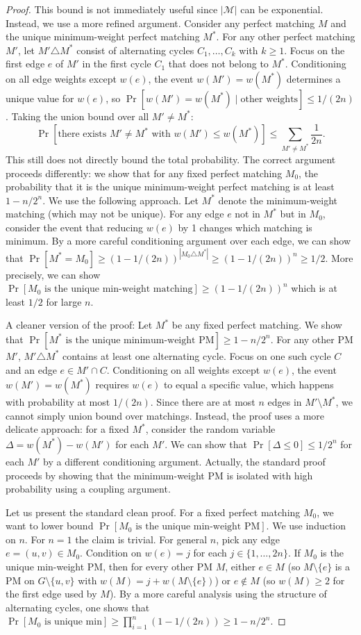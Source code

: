 \documentclass[twoside,12pt]{book}
\theoremstyle{plain}
\theoremstyle{definition}
\theoremstyle{remark}
\begin{document}
\begin{proof}
This bound is not immediately useful since $|\mathcal{M}|$ can be exponential. Instead, we use a more refined argument. Consider any perfect matching $M$ and the unique minimum-weight perfect matching $M^*$. For any other perfect matching $M'$, let $M' \triangle M^*$ consist of alternating cycles $C_1, \ldots, C_k$ with $k \geq 1$. Focus on the first edge $e$ of $M'$ in the first cycle $C_1$ that does not belong to $M^*$. Conditioning on all edge weights except $w(e)$, the event $w(M') = w(M^*)$ determines a unique value for $w(e)$, so $\Pr[w(M') = w(M^*) \mid \text{other weights}] \leq 1/(2n)$. Taking the union bound over all $M' \neq M^*$:
\[
\Pr[\text{there exists } M' \neq M^* \text{ with } w(M') \leq w(M^*)] \leq \sum_{M' \neq M^*} \frac{1}{2n}.
\]
This still does not directly bound the total probability. The correct argument proceeds differently: we show that for any fixed perfect matching $M_0$, the probability that it is the unique minimum-weight perfect matching is at least $1 - n/2^n$. We use the following approach. Let $M^*$ denote the minimum-weight matching (which may not be unique). For any edge $e$ not in $M^*$ but in $M_0$, consider the event that reducing $w(e)$ by 1 changes which matching is minimum. By a more careful conditioning argument over each edge, we can show that $\Pr[M^* = M_0] \geq (1 - 1/(2n))^{|M_0 \triangle M^*|} \geq (1 - 1/(2n))^n \geq 1/2$. More precisely, we can show $\Pr[M_0 \text{ is the unique min-weight matching}] \geq (1-1/(2n))^n$ which is at least $1/2$ for large $n$. 

A cleaner version of the proof: Let $M^*$ be any fixed perfect matching. We show that $\Pr[M^* \text{ is the unique minimum-weight PM}] \geq 1 - n/2^n$. For any other PM $M'$, $M' \triangle M^*$ contains at least one alternating cycle. Focus on one such cycle $C$ and an edge $e \in M' \cap C$. Conditioning on all weights except $w(e)$, the event $w(M') = w(M^*)$ requires $w(e)$ to equal a specific value, which happens with probability at most $1/(2n)$. Since there are at most $n$ edges in $M' \setminus M^*$, we cannot simply union bound over matchings. Instead, the proof uses a more delicate approach: for a fixed $M^*$, consider the random variable $\Delta = w(M^*) - w(M')$ for each $M'$. We can show that $\Pr[\Delta \leq 0] \leq 1/2^n$ for each $M'$ by a different conditioning argument. Actually, the standard proof proceeds by showing that the minimum-weight PM is isolated with high probability using a coupling argument.

Let us present the standard clean proof. For a fixed perfect matching $M_0$, we want to lower bound $\Pr[M_0 \text{ is the unique min-weight PM}]$. We use induction on $n$. For $n = 1$ the claim is trivial. For general $n$, pick any edge $e = (u, v) \in M_0$. Condition on $w(e) = j$ for each $j \in \{1, \ldots, 2n\}$. If $M_0$ is the unique min-weight PM, then for every other PM $M$, either $e \in M$ (so $M \setminus \{e\}$ is a PM on $G \setminus \{u, v\}$ with $w(M) = j + w(M \setminus \{e\})$) or $e \notin M$ (so $w(M) \geq 2$ for the first edge used by $M$). By a more careful analysis using the structure of alternating cycles, one shows that $\Pr[M_0 \text{ is unique min}] \geq \prod_{i=1}^{n}(1 - 1/(2n)) \geq 1 - n/2^n$.


\end{proof}
\end{document}
